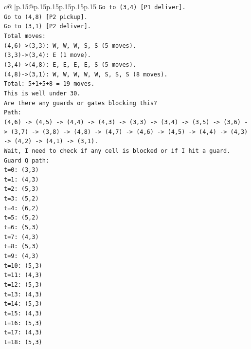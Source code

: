 \documentclass{article}
\begin{document}
{\begin{supertabular}{c@{$\;$}|p{.15\linewidth}@{}p{.15\linewidth}p{.15\linewidth}p{.15\linewidth}p{.15\linewidth}p{.15\linewidth}}
{{{\texttt{Go to (3,4) {[}P1 deliver{]}.} \\
\texttt{Go to (4,8) {[}P2 pickup{]}.} \\
\texttt{Go to (3,1) {[}P2 deliver{]}.} \\
\texttt{Total moves:} \\
\texttt{(4,6){-}>(3,3): W, W, W, S, S (5 moves).} \\
\texttt{(3,3){-}>(3,4): E (1 move).} \\
\texttt{(3,4){-}>(4,8): E, E, E, E, S (5 moves).} \\
\texttt{(4,8){-}>(3,1): W, W, W, W, W, S, S, S (8 moves).} \\
\texttt{Total: 5+1+5+8 = 19 moves.} \\
\texttt{This is well under 30.} \\
\texttt{Are there any guards or gates blocking this?} \\
\texttt{Path:} \\
\texttt{(4,6) {-}> (4,5) {-}> (4,4) {-}> (4,3) {-}> (3,3) {-}> (3,4) {-}> (3,5) {-}> (3,6) {-}> (3,7) {-}> (3,8) {-}> (4,8) {-}> (4,7) {-}> (4,6) {-}> (4,5) {-}> (4,4) {-}> (4,3) {-}> (4,2) {-}> (4,1) {-}> (3,1).} \\
\texttt{Wait, I need to check if any cell is blocked or if I hit a guard.} \\
\texttt{Guard Q path:} \\
\texttt{t=0: (3,3)} \\
\texttt{t=1: (4,3)} \\
\texttt{t=2: (5,3)} \\
\texttt{t=3: (5,2)} \\
\texttt{t=4: (6,2)} \\
\texttt{t=5: (5,2)} \\
\texttt{t=6: (5,3)} \\
\texttt{t=7: (4,3)} \\
\texttt{t=8: (5,3)} \\
\texttt{t=9: (4,3)} \\
\texttt{t=10: (5,3)} \\
\texttt{t=11: (4,3)} \\
\texttt{t=12: (5,3)} \\
\texttt{t=13: (4,3)} \\
\texttt{t=14: (5,3)} \\
\texttt{t=15: (4,3)} \\
\texttt{t=16: (5,3)} \\
\texttt{t=17: (4,3)} \\
\texttt{t=18: (5,3)} \\
}}}
\end{supertabular}}
\end{document}
